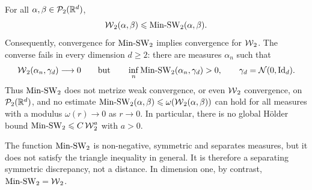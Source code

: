 \begin{prop}\label{prop-min-sw-comparison}
	For all $\alpha,\beta\in\mathcal{P}_2(\mathbb{R}^d)$,
	\begin{equation}\label{eq-min-sw-comparison}
		\operatorname{\mathcal{W}}_2(\alpha,\beta)
		\leqslant
		\operatorname{Min\text{-}SW}_2(\alpha,\beta).
	\end{equation}
	Consequently, convergence for $\operatorname{Min\text{-}SW}_2$ implies convergence for $\operatorname{\mathcal{W}}_2$. The converse fails in every dimension $d\geq2$: there are measures $\alpha_n$ such that
	\begin{equation}\label{eq-min-sw-topological-counterexample}
		\operatorname{\mathcal{W}}_2(\alpha_n,\gamma_d)\longrightarrow0
		\qquad\text{but}\qquad
		\inf_n\operatorname{Min\text{-}SW}_2(\alpha_n,\gamma_d)>0,
		\qquad
		\gamma_d=\mathcal{N}(0,\mathrm{Id}_d).
	\end{equation}
	Thus $\operatorname{Min\text{-}SW}_2$ does not metrize weak convergence, or even $\operatorname{\mathcal{W}}_2$ convergence, on $\mathcal{P}_2(\mathbb{R}^d)$, and no estimate
	$\operatorname{Min\text{-}SW}_2(\alpha,\beta)\leqslant\omega(\operatorname{\mathcal{W}}_2(\alpha,\beta))$ can hold for all measures with a modulus $\omega(r)\to0$ as $r\to0$. In particular, there is no global H\"older bound $\operatorname{Min\text{-}SW}_2\leqslant C\operatorname{\mathcal{W}}_2^a$ with $a>0$.

	The function $\operatorname{Min\text{-}SW}_2$ is non-negative, symmetric and separates measures, but it does not satisfy the triangle inequality in general. It is therefore a separating symmetric discrepancy, not a distance. In dimension one, by contrast, $\operatorname{Min\text{-}SW}_2=\operatorname{\mathcal{W}}_2$.
\end{prop}

